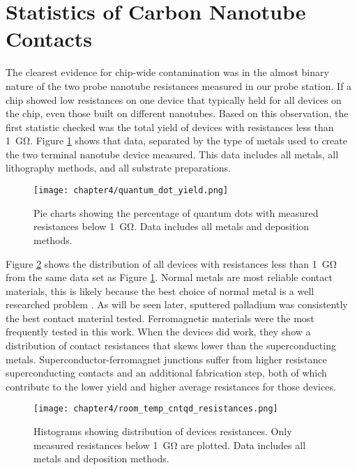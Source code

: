 \section{Statistics of Carbon Nanotube Contacts}

The clearest evidence for chip-wide contamination was in the almost binary nature of the two probe nanotube resistances measured in our probe station. If a chip showed low resistances on one device that typically held for all devices on the chip, even those built on different nanotubes. Based on this observation, the first statistic checked was the total yield of devices with resistances less than \SI{1}{\giga\ohm}. Figure \ref{fig:quantum_dot_yield} shows that data, separated by the type of metals used to create the two terminal nanotube device measured. This data includes all metals, all lithography methods, and all substrate preparations.

\begin{figure}
    \centering
    \texttt{[image: chapter4/quantum\_dot\_yield.png]}
    \caption{Pie charts showing the percentage of quantum dots with measured resistances below \SI{1}{\giga\ohm}. Data includes all metals and deposition methods.}
    \label{fig:quantum_dot_yield}
\end{figure}

Figure \ref{fig:rt_resistances} shows the distribution of all devices with resistances less than \SI{1}{\giga\ohm} from the same data set as Figure \ref{fig:quantum_dot_yield}. Normal metals are most reliable contact materials, this is likely because the best choice of normal metal is a well researched problem \cite{Javey2003, Song2011, Kane2011}. As will be seen later, sputtered palladium was consistently the best contact material tested. Ferromagnetic materials were the most frequently tested in this work. When the devices did work, they show a distribution of contact resistances that skews lower than the superconducting metals. Superconductor-ferromagnet junctions suffer from higher resistance superconducting contacts and an additional fabrication step, both of which contribute to the lower yield and higher average resistances for those devices.

\begin{figure}
    \centering
    \texttt{[image: chapter4/room\_temp\_cntqd\_resistances.png]}
    \caption{Histograms showing distribution of devices resistances. Only measured resistances below \SI{1}{\giga\ohm} are plotted. Data includes all metals and deposition methods.}
    \label{fig:rt_resistances}
\end{figure}

